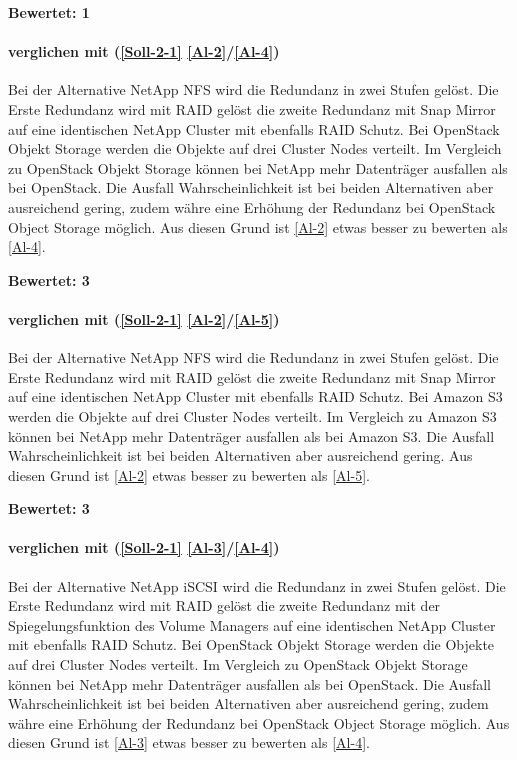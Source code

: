 \textbf{Bewertet: 1}


\paragraph*{  verglichen mit  (\ref{Soll-2-1} \ref{Al-2}/\ref{Al-4})}
Bei der Alternative NetApp NFS wird die Redundanz in zwei Stufen gelöst. Die Erste Redundanz wird mit RAID gelöst die zweite Redundanz mit Snap Mirror auf eine identischen NetApp Cluster mit ebenfalls RAID Schutz. Bei OpenStack Objekt Storage werden die Objekte auf drei Cluster Nodes verteilt. Im Vergleich zu OpenStack Objekt Storage können bei NetApp mehr Datenträger ausfallen als bei OpenStack. Die Ausfall Wahrscheinlichkeit ist bei beiden Alternativen aber ausreichend gering, zudem währe eine Erhöhung der Redundanz bei OpenStack Object Storage möglich. Aus diesen Grund ist  \ref{Al-2} etwas besser zu bewerten als  \ref{Al-4}.

\textbf{Bewertet: 3}

\paragraph*{  verglichen mit  (\ref{Soll-2-1} \ref{Al-2}/\ref{Al-5})}
Bei der Alternative NetApp NFS wird die Redundanz in zwei Stufen gelöst. Die Erste Redundanz wird mit RAID gelöst die zweite Redundanz mit Snap Mirror auf eine identischen NetApp Cluster mit ebenfalls RAID Schutz. Bei Amazon S3 werden die Objekte auf drei Cluster Nodes verteilt. Im Vergleich zu Amazon S3 können bei NetApp mehr Datenträger ausfallen als bei Amazon S3. Die Ausfall Wahrscheinlichkeit ist bei beiden Alternativen aber ausreichend gering. Aus diesen Grund ist  \ref{Al-2} etwas besser zu bewerten als  \ref{Al-5}.

\textbf{Bewertet: 3}

\paragraph*{  verglichen mit  (\ref{Soll-2-1} \ref{Al-3}/\ref{Al-4})}
Bei der Alternative NetApp iSCSI wird die Redundanz in zwei Stufen gelöst. Die Erste Redundanz wird mit RAID gelöst die zweite Redundanz mit der Spiegelungsfunktion des Volume Managers auf eine identischen NetApp Cluster mit ebenfalls RAID Schutz. Bei OpenStack Objekt Storage werden die Objekte auf drei Cluster Nodes verteilt. Im Vergleich zu OpenStack Objekt Storage können bei NetApp mehr Datenträger ausfallen als bei OpenStack. Die Ausfall Wahrscheinlichkeit ist bei beiden Alternativen aber ausreichend gering, zudem währe eine Erhöhung der Redundanz bei OpenStack Object Storage möglich. Aus diesen Grund ist  \ref{Al-3} etwas besser zu bewerten als  \ref{Al-4}.

